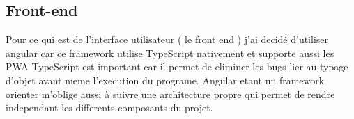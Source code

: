 \subsection{Front-end}\label{subsec:front-end}
Pour ce qui est de l'interface utilisateur ( le front end ) j'ai decidé d'utiliser angular car ce framework utilise TypeScript nativement et supporte aussi les PWA
TypeScript est important car il permet de eliminer les bugs lier au typage d'objet avant meme l'execution du programe.
Angular etant un framework orienter m'oblige aussi à suivre une architecture propre qui permet de rendre independant les differents composants du projet.

